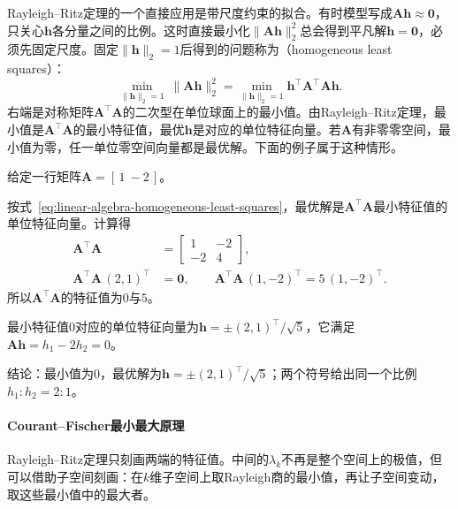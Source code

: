 Rayleigh--Ritz定理的一个直接应用是带尺度约束的拟合。有时模型写成$\bm A\bm h\approx\bm0$，只关心$\bm h$各分量之间的比例。这时直接最小化$\lVert\bm A\bm h\rVert_2^2$总会得到平凡解$\bm h=\bm0$，必须先固定尺度。固定$\lVert\bm h\rVert_2=1$后得到的问题称为（homogeneous least squares）：
\begin{equation}
 \min_{\lVert\bm h\rVert_2=1}\ \lVert\bm A\bm h\rVert_2^2
 =\min_{\lVert\bm h\rVert_2=1}\bm h^\top\bm A^\top\bm A\bm h.
 \label{eq:linear-algebra-homogeneous-least-squares}
\end{equation}
右端是对称矩阵$\bm A^\top\bm A$的二次型在单位球面上的最小值。由Rayleigh--Ritz定理，最小值是$\bm A^\top\bm A$的最小特征值，最优$\bm h$是对应的单位特征向量。若$\bm A$有非零零空间，最小值为零，任一单位零空间向量都是最优解。下面的例子属于这种情形。
\begin{example}[一个方程的齐次最小二乘]
\label{ex:ls-homogeneous-least-squares-one-row}
给定一行矩阵$\bm A=[\,1\ -2\,]$。

按式~\eqref{eq:linear-algebra-homogeneous-least-squares}，最优解是$\bm A^\top\bm A$最小特征值的单位特征向量。计算得
\[
 \begin{aligned}
 \bm A^\top\bm A&=\begin{bmatrix}1&-2\\-2&4\end{bmatrix},\\
 \bm A^\top\bm A\,(2,1)^\top&=\bm0,\qquad
 \bm A^\top\bm A\,(1,-2)^\top=5\,(1,-2)^\top .
 \end{aligned}
\]
所以$\bm A^\top\bm A$的特征值为$0$与$5$。

最小特征值$0$对应的单位特征向量为$\bm h=\pm(2,1)^\top/\sqrt5$，它满足$\bm A\bm h=h_1-2h_2=0$。

结论：最小值为$0$，最优解为$\bm h=\pm(2,1)^\top/\sqrt5$；两个符号给出同一个比例$h_1:h_2=2:1$。
\end{example}

\paragraph{Courant--Fischer最小最大原理}

Rayleigh--Ritz定理只刻画两端的特征值。中间的$\lambda_k$不再是整个空间上的极值，但可以借助子空间刻画：在$k$维子空间上取Rayleigh商的最小值，再让子空间变动，取这些最小值中的最大者。

